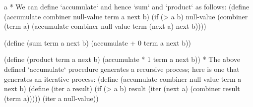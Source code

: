 \begitems\novspaces\style a
* We can define `accumulate` and hence `sum` and `product` as follows:
\begtt\scm
(define (accumulate combiner null-value term a next b)
  (if (> a b)
      null-value
      (combiner (term a)
                (accumulate combiner null-value term (next a) next b))))

(define (sum term a next b)
  (accumulate + 0 term a next b))

(define (product term a next b)
  (accumulate * 1 term a next b))
\endtt
* The above defined `accumulate` procedure generates a recursive process;  here is one that generates an iterative process:
\begtt\scm
(define (accumulate combiner null-value term a next b)
  (define (iter a result)
    (if (> a b)
        result
        (iter (next a) (combiner result (term a)))))
  (iter a null-value))
\endtt
\enditems
